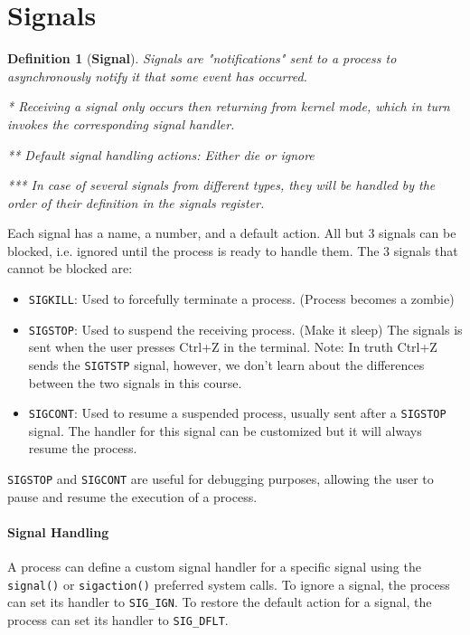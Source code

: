 \documentclass[openany,12pt]{book}
\newtheorem*{definition}{Definition}
\begin{document}
\newpage
\section*{Signals}
\begin{definition}
    [\textbf{Signal}]
    Signals are "notifications" sent to a process to asynchronously notify it that some event has occurred.

    * Receiving a signal only occurs then returning from kernel mode, which in turn invokes the corresponding signal handler.

    ** Default signal handling actions: Either die or ignore

    *** In case of several signals from different types, they will be handled by the order of their definition in the signals register.
\end{definition}

\vspace{1em}

Each signal has a name, a number, and a default action. All but 3 signals can be blocked, i.e. ignored until the process is ready to handle them. The 3 signals that cannot be blocked are:
\begin{itemize}
    \item \texttt{SIGKILL}: Used to forcefully terminate a process. (Process becomes a zombie)
    \item \texttt{SIGSTOP}: Used to suspend the receiving process. (Make it sleep) The signals is sent when the user presses Ctrl+Z in the terminal. {\color{gray}Note: In truth Ctrl+Z sends the \texttt{SIGTSTP} signal, however, we don't learn about the differences between the two signals in this course.}
    \item \texttt{SIGCONT}: Used to resume a suspended process, usually sent after a \texttt{SIGSTOP} signal. The handler for this signal can be customized but it {\color{red}will always} resume the process.
\end{itemize}
\texttt{SIGSTOP} and \texttt{SIGCONT} are useful for debugging purposes, allowing the user to pause and resume the execution of a process.

\paragraph{Signal Handling}
A process can define a custom signal handler for a specific signal using the \texttt{signal()} or \texttt{sigaction()} {\color{gray}preferred} system calls.
To ignore a signal, the process can set its handler to \texttt{SIG\_IGN}. To restore the default action for a signal, the process can set its handler to \texttt{SIG\_DFLT}.
\end{document}
